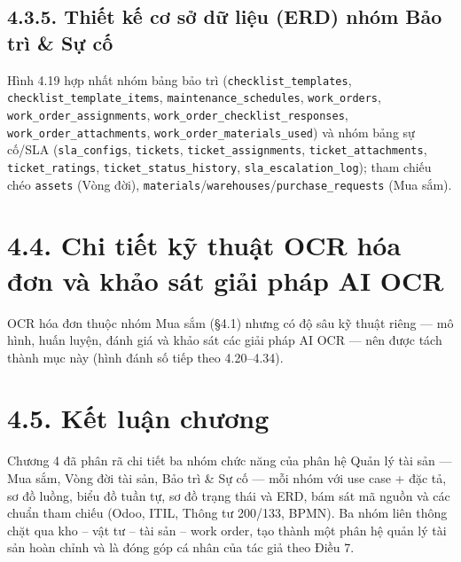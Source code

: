 
\subsection*{4.3.5. Thiết kế cơ sở dữ liệu (ERD) nhóm Bảo trì \& Sự cố}
Hình 4.19 hợp nhất nhóm bảng bảo trì (\texttt{checklist\_templates}, \texttt{checklist\_template\_items}, \texttt{maintenance\_schedules}, \texttt{work\_orders}, \texttt{work\_order\_assignments}, \texttt{work\_order\_checklist\_responses}, \texttt{work\_order\_attachments}, \texttt{work\_order\_materials\_used}) và nhóm bảng sự cố/SLA (\texttt{sla\_configs}, \texttt{tickets}, \texttt{ticket\_assignments}, \texttt{ticket\_attachments}, \texttt{ticket\_ratings}, \texttt{ticket\_status\_history}, \texttt{sla\_escalation\_log}); tham chiếu chéo \texttt{assets} (Vòng đời), \texttt{materials}/\texttt{warehouses}/\texttt{purchase\_requests} (Mua sắm).


\section*{4.4. Chi tiết kỹ thuật OCR hóa đơn và khảo sát giải pháp AI OCR}
OCR hóa đơn thuộc nhóm Mua sắm (§4.1) nhưng có độ sâu kỹ thuật riêng — mô hình, huấn luyện, đánh giá và khảo sát các giải pháp AI OCR — nên được tách thành mục này (hình đánh số tiếp theo 4.20--4.34).


\section*{4.5. Kết luận chương}
Chương 4 đã phân rã chi tiết ba nhóm chức năng của phân hệ Quản lý tài sản — Mua sắm, Vòng đời tài sản, Bảo trì \& Sự cố — mỗi nhóm với use case + đặc tả, sơ đồ luồng, biểu đồ tuần tự, sơ đồ trạng thái và ERD, bám sát mã nguồn và các chuẩn tham chiếu (Odoo, ITIL, Thông tư 200/133, BPMN). Ba nhóm liên thông chặt qua kho -- vật tư -- tài sản -- work order, tạo thành một phân hệ quản lý tài sản hoàn chỉnh và là đóng góp cá nhân của tác giả theo Điều 7.
